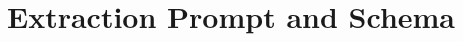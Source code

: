 \documentclass[10pt,twocolumn,letterpaper]{article}
\begin{document}
%
%
%
%
%





\clearpage
\appendix

\section{Extraction Prompt and Schema}
\label{app:prompt}
\end{document}
